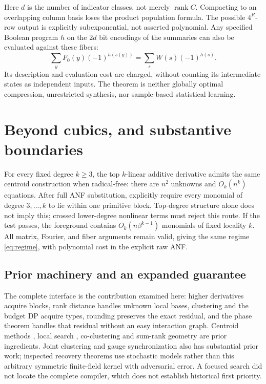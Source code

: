 \documentclass[11pt,a4paper]{article}
\newcommand{\rank}{\operatorname{rank}}\newcommand{\poly}{\operatorname{poly}}
\begin{document}
Here $d$ is the number of indicator classes, not merely $\rank C$.
Compacting to an overlapping column basis loses the product
population formula. The possible $4^R$-row output is explicitly
subexponential, not asserted polynomial.
Any specified Boolean program $h$ on the $2d$ bit encodings of
the summaries can also be evaluated against these fibers:
\[
\sum_yF_0(y)(-1)^{h(s(y))}
=\sum_s W(s)(-1)^{h(s)}.
\]
Its description and evaluation cost are charged, without counting
its intermediate states as independent inputs. The theorem is
neither globally optimal compression, unrestricted synthesis,
nor sample-based statistical learning.

\section{Beyond cubics, and substantive boundaries}
\label{sec:bounds}
For every fixed degree $k\ge3$, the top $k$-linear additive
derivative admits the same centroid construction when radical-free:
there are $n^2$ unknowns and $O_k(n^k)$ equations.
After full ANF substitution, explicitly require every monomial of
degree $3,\ldots,k$ to lie within one primitive block.
Top-degree structure alone does not imply this; crossed
lower-degree nonlinear terms must reject this route.
If the test passes, the foreground contains
$O_k(n\beta^{k-1})$ monomials of fixed locality $k$.
All matrix, Fourier, and fiber arguments remain valid, giving
the same regime \eqref{eq:regime}, with polynomial cost in
the explicit raw ANF.

\subsection{Prior machinery and an expanded guarantee}
The complete interface is the contribution examined here:
higher derivatives acquire blocks, rank distance handles
unknown local bases, clustering and the budget DP acquire types,
rounding preserves the exact residual, and the phase theorem
handles that residual without an easy interaction graph.
Centroid methods \cite{huang,blaser}, local search \cite{arya},
co-clustering \cite{cocluster} and sum-rank geometry \cite{sumrank}
are prior ingredients. Joint clustering and gauge synchronization
also has substantial prior work; inspected recovery theorems
\cite{sync} use stochastic models rather than this arbitrary
symmetric finite-field kernel with adversarial error.
A focused search did not locate the complete compiler, which
does not establish historical first priority.
\end{document}
